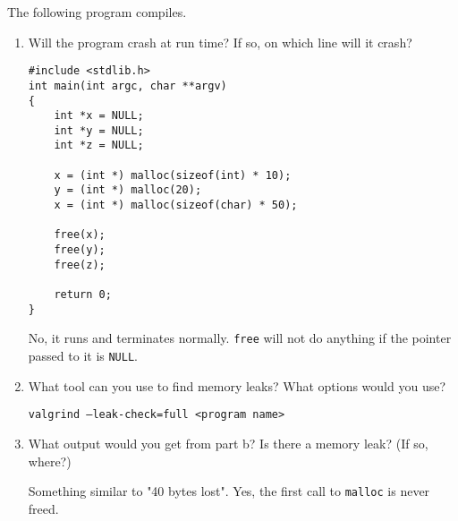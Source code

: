 
The following program compiles.
\begin{enumerate}
\item Will the program crash at run time? If so, on which line will it crash?

\begin{lstlisting}
#include <stdlib.h>
int main(int argc, char **argv)
{
	int *x = NULL;
	int *y = NULL;
	int *z = NULL;

	x = (int *) malloc(sizeof(int) * 10);
	y = (int *) malloc(20);
	x = (int *) malloc(sizeof(char) * 50);

	free(x);
	free(y);
	free(z);

	return 0;
}
\end{lstlisting}

\begin{answer}
No, it runs and terminates normally.
\texttt{free} will not do anything if the pointer passed to it is \texttt{NULL}.
\end{answer}

\item What tool can you use to find memory leaks? What options would you use?

\begin{answer}
\texttt{valgrind --leak-check=full <program name>}
\end{answer}

\item What output would you get from part b?  Is there a memory leak? (If so, where?)

\begin{answer}
Something similar to "40 bytes lost". Yes, the first call to \texttt{malloc} is never freed.
\end{answer}
\end{enumerate}
